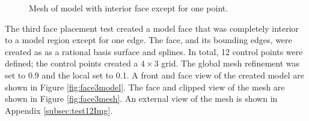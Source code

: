 \documentclass[a4paper, 12pt]{article}
\begin{document}
\begin{figure}[H]
  \centering
  \caption{Mesh of model with interior face except for one point.}
  \label{fig:face2mesh}
\end{figure}

The third face placement test created a model face that was completely 
interior to a model region except for one edge.
The face, and its bounding edges,  were created as 
as a rational basis surface and splines. In total, 12 control points were 
defined; the control points created a $4\times3$
grid. The global mesh refinement was set to 0.9 and the local set to 0.1. 
A front and face view of the created model 
are shown in Figure \ref{fig:face3model}.
The face and clipped view of the mesh 
are shown in Figure \ref{fig:face3mesh}.
An external view of the mesh is shown in Appendix \ref{subsec:test12Img}.
\end{document}
